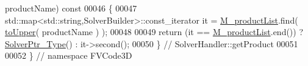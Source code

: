 \begin{DoxyCode}
      productName)\textcolor{keyword}{ const}
00046 \textcolor{keyword}{}\{
00047     std::map<std::string,SolverBuilder>::const\_iterator it = \hyperlink{classFVCode3D_1_1SolverHandler_a8c2ce305ada54d628a080f7f33d09140}{M\_productList}.find( 
      \hyperlink{namespaceFVCode3D_aab0ceb729c2ff3e7fd288097aee76a59}{toUpper}( productName ) );
00048 
00049     \textcolor{keywordflow}{return} (it == \hyperlink{classFVCode3D_1_1SolverHandler_a8c2ce305ada54d628a080f7f33d09140}{M\_productList}.end()) ? \hyperlink{namespaceFVCode3D_a0b32227a4e5847c2fb27215fb81d9363}{SolverPtr\_Type}() : it->second();
00050 \} \textcolor{comment}{// SolverHandler::getProduct}
00051 
00052 \} \textcolor{comment}{// namespace FVCode3D}
\end{DoxyCode}
